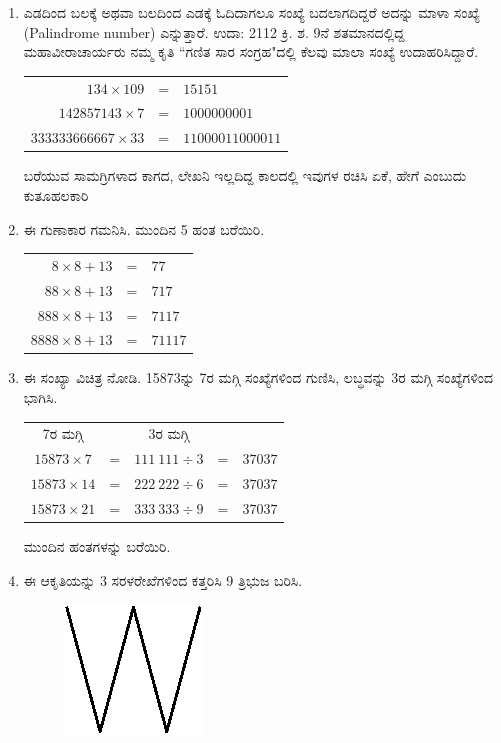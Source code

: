\begin{enumerate}
\item ಎಡದಿಂದ ಬಲಕ್ಕೆ ಅಥವಾ ಬಲದಿಂದ ಎಡಕ್ಕೆ ಓದಿದಾಗಲೂ ಸಂಖ್ಯೆ ಬದಲಾಗದಿದ್ದರೆ ಅದನ್ನು ಮಾಳಾ ಸಂಖ್ಯೆ (Palindrome number) ಎನ್ನುತ್ತಾರೆ. ಉದಾ: 2112 ಕ್ರಿ. ಶ. 9ನೆ ಶತಮಾನದಲ್ಲಿದ್ದ ಮಹಾವೀರಾಚಾರ್ಯರು ನಮ್ಮ ಕೃತಿ ``ಗಣಿತ ಸಾರ ಸಂಗ್ರಹ"ದಲ್ಲಿ ಕೆಲವು ಮಾಲಾ ಸಂಖ್ಯೆ ಉದಾಹರಿಸಿದ್ದಾರೆ. 

\begin{tabular}[t]{rcl}
$134\times 109$ & = & $15151$\\
$142857143\times 7$ & = & $1000000001$\\
$333333666667\times 33$ & = & $11000011000011$
\end{tabular}

ಬರೆಯುವ ಸಾಮಗ್ರಿಗಳಾದ ಕಾಗದ, ಲೇಖನಿ ಇಲ್ಲದಿದ್ದ ಕಾಲದಲ್ಲಿ ಇವುಗಳ ರಚಿಸಿ ಏಕೆ, ಹೇಗೆ ಎಂಬುದು ಕುತೂಹಲಕಾರಿ 

\item ಈ ಗುಣಾಕಾರ ಗಮನಿಸಿ. ಮುಂದಿನ 5 ಹಂತ ಬರೆಯಿರಿ. 

\begin{tabular}[t]{rcl}
$8\times 8 + 13$ & = & $77$\\
$88\times 8 + 13$ & = & $717$\\
$888\times 8 + 13$ & = & $7117$\\
$8888\times 8 + 13$ & = & $71117$
\end{tabular}

\item ಈ ಸಂಖ್ಯಾ ವಿಚಿತ್ರ ನೋಡಿ. 15873ನ್ನು 7ರ ಮಗ್ಗಿ ಸಂಖ್ಯೆಗಳಿಂದ ಗುಣಿಸಿ, ಲಬ್ಧವನ್ನು 3ರ ಮಗ್ಗಿ ಸಂಖ್ಯೆಗಳಿಂದ ಭಾಗಿಸಿ. 

\begin{tabular}[t]{ccccc}
\qquad 7ರ ಮಗ್ಗಿ &  & \qquad 3ರ ಮಗ್ಗಿ & & \\
$15873\times 7$ & = & $111~111\div 3$ & = & $37037$\\
$15873\times 14$ & = & $222~222\div 6$ & = & $37037$\\
$15873\times 21$ & = & $333~333\div 9$ & = & $37037$
\end{tabular}

ಮುಂದಿನ ಹಂತಗಳನ್ನು ಬರೆಯಿರಿ. 

\item ಈ ಆಕೃತಿಯನ್ನು 3 ಸರಳರೇಖೆಗಳಿಂದ ಕತ್ತರಿಸಿ 9 ತ್ರಿಭುಜ ಬರಿಸಿ. 

\begin{figure}[H]
\centering
\includegraphics{images/chap6/q14.eps}
\end{figure}


\end{enumerate}

